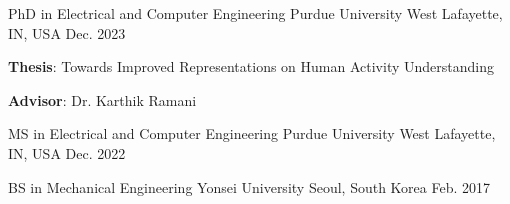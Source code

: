 


\begin{cventries}


    \cventry
    {PhD in Electrical and Computer Engineering} %
    {Purdue University} %
    {West Lafayette, IN, USA} %
    {Dec. 2023} %
    { %
    \begin{cvitems}
        \item {\textbf{Thesis}: Towards Improved Representations on Human Activity Understanding}
        \item {\textbf{Advisor}: Dr. Karthik Ramani}
    \end{cvitems}
    }

    \cventry
    {MS in Electrical and Computer Engineering} %
    {Purdue University} %
    {West Lafayette, IN, USA} %
    {Dec. 2022} %
    { %
    }
    \vspace{-1em}

    \cventry
    {BS in Mechanical Engineering} %
    {Yonsei University} %
    {Seoul, South Korea} %
    {Feb. 2017} %
    { %
    }
    \vspace{-1em}

\end{cventries}

